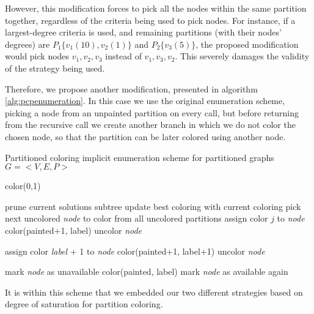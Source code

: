 However, this modification forces to pick all the nodes within the same partition together, regardless of the criteria being used to pick nodes. For instance, if a largest-degree criteria is used, and remaining partitions (with their nodes' degrees) are $P_1 \{v_1(10),v_2(1)\}$ and $P_2 \{v_3(5)\}$, the proposed modification would pick nodes $v_1, v_2, v_3$ instead of $v_1, v_3, v_2$. This severely damages the validity of the strategy being used.

Therefore, we propose another modification, presented in algorithm \ref{alg:pcpenumeration}. In this case we use the original enumeration scheme, picking a node from an unpainted partition on every call, but before returning from the recursive call we create another branch in which we do not color the chosen node, so that the partition can be later colored using another node.

\begin{algorithm}
\caption{Partitioned coloring implicit enumeration scheme for partitioned graphs $G = <V,E,P>$}
\label{alg:pcpenumeration}

\begin{algorithmic}
\CALL color(0,1)

		\STATE prune current solutions subtree
		\STATE update best coloring with current coloring
	\ELSE
		\STATE pick next uncolored \textit{node} to color	from all uncolored partitions	
				\STATE assign color $j$ to \textit{node}
				\CALL color(painted+1, label)
				\STATE uncolor \textit{node}
			\ENDIF
		\ENDFOR
		
		\STATE assign color \textit{label} + 1 to \textit{node}
		\CALL color(painted+1, label+1)
		\STATE uncolor \textit{node}
		
			\STATE mark \textit{node} as unavailable
			\CALL color(painted, label)
			\STATE mark \textit{node} as available again
		\ENDIF
		
	\ENDIF
\ENDPROC

\end{algorithmic}
\end{algorithm}

It is within this scheme that we embedded our two different strategies based on degree of saturation for partition coloring.

